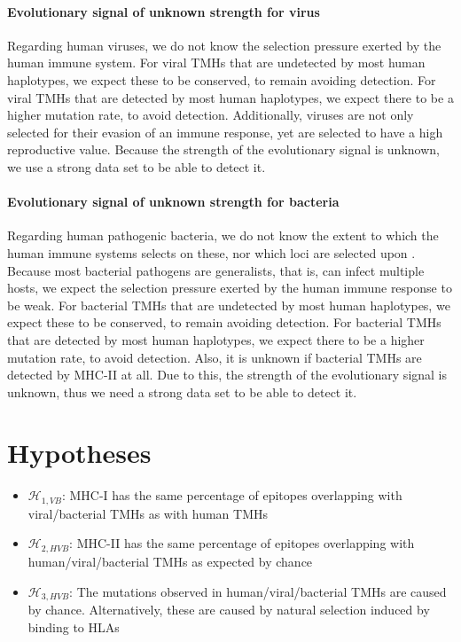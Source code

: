 \paragraph{Evolutionary signal of unknown strength for virus}

Regarding human viruses, we do not know the selection pressure
exerted by the human immune system.
For viral TMHs that are undetected by most human haplotypes, we
expect these to be conserved, to remain avoiding detection.
For viral TMHs that are detected by most human haplotypes, we
expect there to be a higher mutation rate, to avoid detection.
Additionally, viruses are not only selected for their evasion of an 
immune response, yet are selected to have a high reproductive value.
Because the strength of the evolutionary signal is unknown,
we use a strong data set to be able to detect it.

\paragraph{Evolutionary signal of unknown strength for bacteria}

Regarding human pathogenic bacteria, we do not know the extent to which the 
human immune systems selects on these, nor which loci are selected
upon .
Because most bacterial pathogens are generalists, that is,
can infect multiple hosts, we expect the selection pressure exerted
by the human immune response to be weak.
For bacterial TMHs that are undetected by most human haplotypes, we
expect these to be conserved, to remain avoiding detection.
For bacterial TMHs that are detected by most human haplotypes, we
expect there to be a higher mutation rate, to avoid detection.
Also, it is unknown if bacterial TMHs are detected by MHC-II at all.
Due to this, the strength of the evolutionary signal is unknown,
thus we need a strong data set to be able to detect it.

\section{Hypotheses}


\begin{itemize}
  \item $\mathcal{H}_{1,VB}$: MHC-I has the same percentage of epitopes overlapping
    with viral/bacterial TMHs as with human TMHs
  \item $\mathcal{H}_{2,HVB}$: MHC-II has the same percentage of epitopes overlapping
    with human/viral/bacterial TMHs as expected by chance
  \item $\mathcal{H}_{3,HVB}$: The mutations observed in 
    human/viral/bacterial TMHs are caused by chance.
    Alternatively, these are caused by natural selection
    induced by binding to HLAs
\end{itemize}

